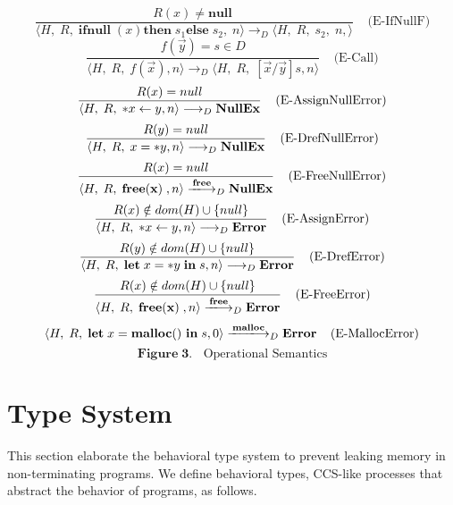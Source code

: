 \documentclass[english]{jssst_ppl} %
\newcommand\LET{\mathbf{let}\;}
\newcommand\FREE{\mathbf{free(x)}\;}
\newcommand\IN{\mathbf{in}\;}
\newcommand\Rtab{\; \; \; \;}
\newcommand\NULL{\mathbf{null}\;}
\newcommand\IFNULL{\mathbf{ifnull}\;}
\newcommand\THEN{\mathbf{then}\;}
\newcommand\ELSE{\mathbf{else}\;}
\newcommand\Lfc{\left\{}
\newcommand\Rfc{\right\}}
\newcommand\Lb{\left[}
\newcommand\Rb{\right]}
\newcommand\coma{,\;}
\newcommand\Malloc{\mathbf{malloc}}
\newcommand\Free{\mathbf{free}}
\newcommand\Cirx{(x)}
\theoremstyle{definition}
\begin{document}
$$
    \frac{R(x) \neq \NULL}
           {\langle H \coma R \coma \IFNULL\Cirx \THEN  s_{1} \ELSE  s_{2} \coma  n \rangle
           \longrightarrow_{D}
           \langle H\coma R\coma s_{2} \coma  n, \rangle}
    \Rtab \mbox{(E-IfNullF)}
$$
$$
     \frac{f(\vec{y}) = s \in D}
            { \langle H\coma R\coma  f(\vec{x}) , n \rangle
               \longrightarrow_{D}
               \langle H\coma R\coma  \Lb \vec{x}/\vec{y} \Rb s , n \rangle}
      \Rtab \mbox{(E-Call)}
$$
$$
      \frac{R(x) = null}
            {\langle H\coma R\coma  *x \leftarrow y , n \rangle
              \longrightarrow_{D}
             \bf NullEx }
      \Rtab \mbox{(E-AssignNullError)}
$$
$$
      \frac{R(y) = null}
             {\langle H\coma R\coma  x = *y, n \rangle
               \longrightarrow_{D}
              \bf NullEx }
             \Rtab \mbox{(E-DrefNullError)}
$$
$$
     \frac{R(x) =  null }
           {\langle H\coma R\coma  \FREE , n \rangle
             \xlongrightarrow{\Free}_{D} \bf NullEx  }
      \Rtab \mbox{(E-FreeNullError)}
$$
$$
     \frac{R(x) \notin dom(H) \cup \Lfc null \Rfc}
           {\langle H\coma R\coma   *x \leftarrow y,  n \rangle
             \longrightarrow_{D}
           \bf  Error }
    \Rtab \mbox{(E-AssignError)}
$$
$$
      \frac{R(y) \notin dom(H) \cup \Lfc null \Rfc}
           {\langle H\coma R\coma  \LET x  = *y \; \IN s, n \rangle
              \longrightarrow_{D}
                \bf  Error }
      \Rtab \mbox{(E-DrefError)}
$$
%
$$
      \frac{R(x) \notin dom(H) \cup \Lfc null \Rfc}
            {\langle H\coma R\coma  \FREE , n \rangle
              \xlongrightarrow{\Free}_{D}
              \bf Error }
     \Rtab \mbox{(E-FreeError)}
$$
$$
      \langle H\coma R\coma \LET x = \Malloc() \ \IN s ,  0  \rangle
      \xlongrightarrow{\Malloc}_{D}
      \mathbf{Error}
      \Rtab \mbox{(E-MallocError)}
$$
$$
     \mathbf{Figure \; 3.} \;\;  \mbox{ Operational Semantics}
$$
%

\section{Type System}
This section elaborate the behavioral type system to prevent leaking memory in non-terminating programs. We define behavioral types, CCS-like processes that abstract the behavior of programs, as follows.
\end{document}
